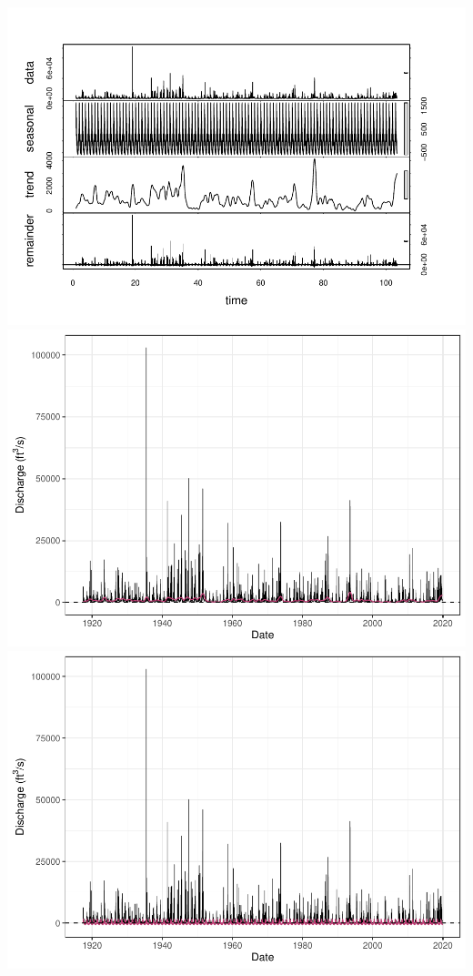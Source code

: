 \documentclass[12pt,]{article}
\begin{document}
\includegraphics{Project_Template_files/figure-latex/unnamed-chunk-6-20.pdf}
\includegraphics{Project_Template_files/figure-latex/unnamed-chunk-6-21.pdf}
\includegraphics{Project_Template_files/figure-latex/unnamed-chunk-6-22.pdf}
\end{document}
